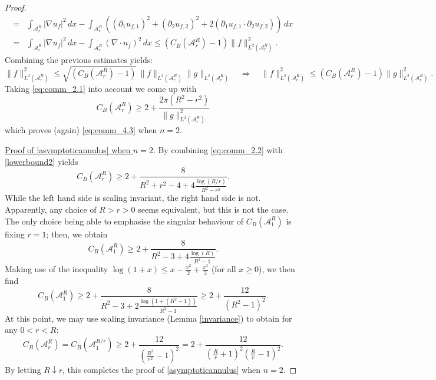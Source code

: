 \documentclass[11pt]{article}
\theoremstyle{plain}
\theoremstyle{definition}
\numberwithin{equation}{section}
\begin{document}
\begin{proof}
\begin{align*}
=&\int_{\mathcal{A}_r^R} | \nabla   u_f|^2\, dx
-\int_{\mathcal{A}_r^R} \left( (\partial_1 u_{f,1})^2+(\partial_2 u_{f,2})^2+2(\partial_1 u_{f,1}\cdot \partial_2 u_{f,2})\right)\, dx\\
=&\int_{\mathcal{A}_r^R} | \nabla   u_f|^2\, dx
-\int_{\mathcal{A}_r^R} \left(\nabla \cdot u_f\right)^2\, dx
\le (C_B(\mathcal{A}_r^R)-1)\| f\|_{L^2(\mathcal{A}_r^R)}^2.
\end{align*}
Combining the previous estimates yields:
$$
\| f\|^2_{L^2(\mathcal{A}_r^R)}\le \sqrt{(C_B(\mathcal{A}_r^R)-1)}\, \| f\|_{L^2(\mathcal{A}_r^R)}\| g\|_{L^2(\mathcal{A}_r^R)}\quad\Longrightarrow\quad \| f\|^2_{L^2(\mathcal{A}_r^R)}\le (C_B(\mathcal{A}_r^R)-1)\| g\|^2_{L^2(\mathcal{A}_r^R)}.
$$
Taking \eqref{eq:comm_2.1} into account we come up with
\begin{equation}\label{lowerbound2}
C_B(\mathcal{A}_r^R)\ge 2 +\frac{2\pi(R^2-r^2)}{\| g\|^2_{L^2(\mathcal{A}_r^R)}}
\end{equation}
which proves (again) \eqref{eq:comm_4.3} when $n=2$.\par
\underline{Proof of \eqref{asymptoticannulus} when $n=2$}. By combining \eqref{eq:comm_2.2} with \eqref{lowerbound2} yields
$$
C_B(\mathcal{A}_r^R)\ge 2 +\frac{8}{ R^2+r^2-4+4\frac{\log (R/r)}{R^2-r^2} }.
$$
While the left hand side is scaling invariant, the right hand side is not. Apparently, any choice of $R>r>0$ seems equivalent, but this is not
the case. The only choice being able to emphasise the singular behaviour of $C_B(\mathcal{A}_1^R)$ is fixing $r=1$; then, we obtain
\begin{equation}\label{eq:comm_2.4}
C_B(\mathcal{A}_1^R)\ge 2 +\frac{8}{ R^2-3+4\frac{\log (R)}{R^2-1} }.
\end{equation}
Making use of the inequality $\log(1+x)\le x-\tfrac{x^2}{2}+\tfrac{x^3}{3}$ (for all $x\ge0$), we then find
$$
C_B(\mathcal{A}_1^R)\ge 2 +\frac{8}{ R^2-3+2\frac{\log (1+(R^2-1))}{R^2-1} }\ge 2+\frac{12}{(R^2-1)^2}.
$$
At this point, we may use scaling invariance (Lemma \ref{invariance}) to obtain for any $0<r<R$:
\begin{equation}\label{eq:comm_2.3}
C_B(\mathcal{A}_r^R)=C_B(\mathcal{A}_1^{R/r})\ge 2+\frac{12}{\left(\frac{R^2}{r^2}-1\right)^2}=2+\frac{12}{\left(\frac{R}{r}+1\right)^2\left(\frac{R}{r}-1\right)^2}.%
\end{equation}
By letting $R\downarrow r$, this completes the proof of \eqref{asymptoticannulus} when $n=2$.\par

\end{proof}
\end{document}
